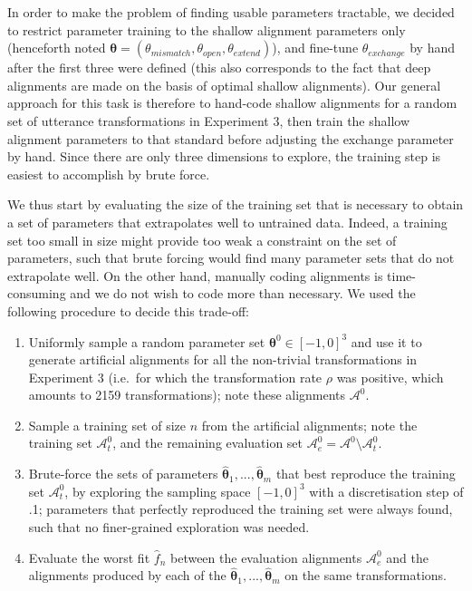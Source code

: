 \documentclass[a4paper,fleqn]{cas-dc}
\begin{document}
In order to make the problem of finding usable parameters tractable, we
decided to restrict parameter training to the shallow alignment
parameters only (henceforth noted
\(\bm{\theta} = (\theta_{mismatch}, \theta_{open}, \theta_{extend})\)),
and fine-tune \(\theta_{exchange}\) by hand after the first three were
defined (this also corresponds to the fact that deep alignments are made
on the basis of optimal shallow alignments). Our general approach for
this task is therefore to hand-code shallow alignments for a random set
of utterance transformations in Experiment 3, then train the shallow
alignment parameters to that standard before adjusting the exchange
parameter by hand. Since there are only three dimensions to explore, the
training step is easiest to accomplish by brute force.

We thus start by evaluating the size of the training set that is
necessary to obtain a set of parameters that extrapolates well to
untrained data. Indeed, a training set too small in size might provide
too weak a constraint on the set of parameters, such that brute forcing
would find many parameter sets that do not extrapolate well. On the
other hand, manually coding alignments is time-consuming and we do not
wish to code more than necessary. We used the following procedure to
decide this trade-off:

\begin{enumerate}
\def\labelenumi{\arabic{enumi}.}
\item
  Uniformly sample a random parameter set
  \(\bm{\theta}^0 \in [-1, 0]^3\) and use it to generate artificial
  alignments for all the non-trivial transformations in Experiment 3
  (i.e.~for which the transformation rate \(\rho\) was positive, which
  amounts to 2159 transformations); note these alignments
  \(\mathcal{A}^0\).
\item
  Sample a training set of size \(n\) from the artificial alignments;
  note the training set \(\mathcal{A}_t^0\), and the remaining
  evaluation set
  \(\mathcal{A}_e^0 = \mathcal{A}^0 \setminus \mathcal{A}_t^0\).
\item
  Brute-force the sets of parameters
  \(\hat{\bm{\theta}}_1, ..., \hat{\bm{\theta}}_m\) that best reproduce
  the training set \(\mathcal{A}_t^0\), by exploring the sampling space
  \([-1, 0]^3\) with a discretisation step of .1; parameters that
  perfectly reproduced the training set were always found, such that no
  finer-grained exploration was needed.
\item
  Evaluate the worst fit \(\hat{f}_n\) between the evaluation alignments
  \(\mathcal{A}_e^0\) and the alignments produced by each of the
  \(\hat{\bm{\theta}}_1, ..., \hat{\bm{\theta}}_m\) on the same
  transformations.
\end{enumerate}
\end{document}
